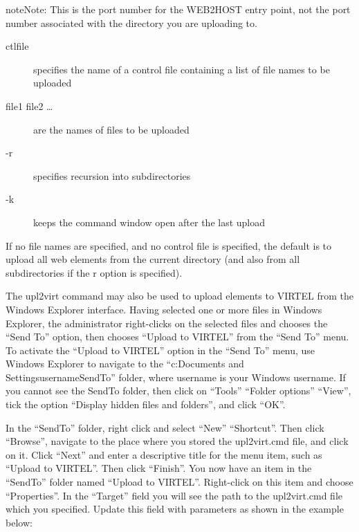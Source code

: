 \documentclass[letterpaper,10pt,english]{sphinxmanual}
\begin{document}
\begin{sphinxadmonition}{note}{Note:}
This is the port number for the WEB2HOST entry point, not the port number associated with the directory you are uploading to.
\end{sphinxadmonition}
\begin{description}
\item[{ctlfile}] \leavevmode
specifies the name of a control file containing a list of file names to be uploaded

\item[{file1 file2 …}] \leavevmode
are the names of files to be uploaded

\item[{-r}] \leavevmode
specifies recursion into subdirectories

\item[{-k}] \leavevmode
keeps the command window open after the last upload

\end{description}

If no file names are specified, and no control file is specified, the default is to upload all web elements from the current directory (and also from all subdirectories if the \textendash{}r option is specified).

\ignorespaces 
{}

The upl2virt command may also be used to upload elements to VIRTEL from the Windows Explorer interface. Having selected one or more files in Windows Explorer, the administrator right-clicks on the selected files and chooses the “Send To” option, then chooses “Upload to VIRTEL” from the “Send To” menu. To activate the “Upload to VIRTEL” option in the “Send To” menu, use Windows Explorer to navigate to the “c:Documents and SettingsusernameSendTo” folder, where username is your Windows username. If you cannot see the SendTo folder, then click on “Tools” \textendash{} “Folder options” \textendash{} “View”, tick the option “Display hidden files and folders”, and click “OK”.

In the “SendTo” folder, right click and select “New” \textendash{} “Shortcut”. Then click “Browse”, navigate to the place where you stored the upl2virt.cmd file, and click on it. Click “Next” and enter a descriptive title for the menu item, such as “Upload to VIRTEL”. Then click “Finish”. You now have an item in the “SendTo” folder named “Upload to VIRTEL”. Right-click on this item and choose “Properties”. In the “Target” field you will see the path to the upl2virt.cmd file which you specified. Update this field with parameters as shown in the example below:
\end{document}
